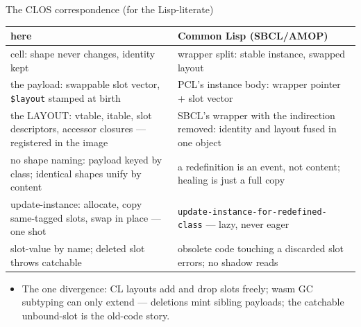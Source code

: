 \documentclass[10pt,presentation]{beamer}
\begin{document}
\begin{frame}[label={sec:org3b19655},fragile]{The CLOS correspondence (for the Lisp-literate)}
 \begin{center}
\scriptsize
\begin{tabular}{p{} p{}}
here & Common Lisp (SBCL/AMOP)\\
\hline
cell: shape never changes, identity kept & wrapper split: stable instance, swapped layout\\
the payload: swappable slot vector, \texttt{\$layout} stamped at birth & PCL's instance body: wrapper pointer + slot vector\\
the LAYOUT: vtable, itable, slot descriptors, accessor closures — registered in the image & SBCL's wrapper with the indirection removed: identity and layout fused in one object\\
no shape naming: payload keyed by class; identical shapes unify by content & a redefinition is an event, not content; healing is just a full copy\\
update-instance: allocate, copy same-tagged slots, swap in place — one shot & \texttt{update-instance-for-redefined-class} — lazy, never eager\\
slot-value by name; deleted slot throws catchable & obsolete code touching a discarded slot errors; no shadow reads\\
\end{tabular}
\end{center}

\begin{itemize}
\item The one divergence: CL layouts add \alert{and drop} slots freely; wasm GC
subtyping can only extend — deletions mint \alert{sibling} payloads; the
catchable unbound-slot is the old-code story.
\end{itemize}
\end{frame}
\end{document}
